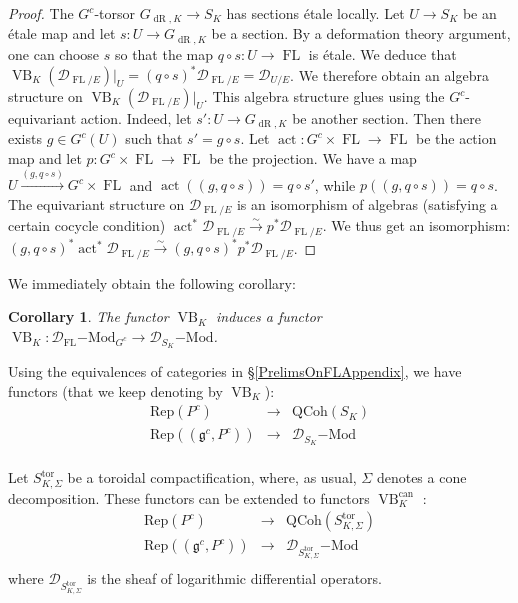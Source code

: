 \documentclass[10pt, oneside]{amsart}
\numberwithin{equation}{subsection}
\newtheorem{corollary}[equation]{Corollary}
\theoremstyle{definition}
\theoremstyle{remark}
\newcommand{\opn}[1]{\operatorname{#1}}
\begin{document}
\begin{proof}
The $G^c$-torsor $G_{\opn{dR},K} \rightarrow S_K$ has sections \'etale locally. Let $U \rightarrow S_K$ be an \'etale map and let $s : U \rightarrow G_{\opn{dR}, K}$ be a section. By a deformation theory argument, one can choose $s$ so that the map $q \circ s : U \rightarrow \opn{FL}$ is \'etale. We deduce that $\opn{VB}_K(\mathcal{D}_{\opn{FL}/E})\vert_U 
 = (q\circ s)^* \mathcal{D}_{\opn{FL}/E} = \mathcal{D}_{U/E}$. 
 We therefore obtain an algebra structure on $\opn{VB}_K(\mathcal{D}_{\opn{FL}/E})\vert_U $. This algebra structure glues using the $G^c$-equivariant action.  Indeed, let $s' : U \rightarrow G_{\opn{dR}, K}$ be another section. Then there exists $g \in G^c(U)$ such that $s' = g \circ s$. Let $\opn{act} : G^c \times \opn{FL} \rightarrow \opn{FL}$ be the action map and let $p : G^c \times \opn{FL} \rightarrow \opn{FL}$ be the projection. We have a map $U \stackrel{(g, q \circ s)}\rightarrow G^c \times \opn{FL}$ and $\opn{act} ( (g, q \circ s)) = q \circ s'$, while $p ( (g, q\circ s)) = q \circ s$. The equivariant structure on 
$\mathcal{D}_{\opn{FL}/E}$ is an isomorphism of algebras (satisfying a certain cocycle condition) $\opn{act}^* \mathcal{D}_{\opn{FL}/E} \xrightarrow{\sim} p^* \mathcal{D}_{\opn{FL}/E}$. We thus get an isomorphism: $ (g, q\circ s)^* \opn{act}^* \mathcal{D}_{\opn{FL}/E} \xrightarrow{\sim}  (g, q \circ s)^* p^* \mathcal{D}_{\opn{FL}/E}$. 
\end{proof}

We immediately obtain the following corollary:

\begin{corollary} 
The functor $\opn{VB}_K$ induces a functor $\opn{VB}_K \colon \mathcal{D}_{\opn{FL}}\mathrm{-Mod}_{G^c} \rightarrow  \mathcal{D}_{S_K}\mathrm{-Mod}$. 
\end{corollary}

Using the equivalences of categories in \S \ref{PrelimsOnFLAppendix}, we have functors (that we keep denoting by $\opn{VB}_K$):
\begin{eqnarray*}
\mathrm{Rep}(P^c) & \rightarrow & \mathrm{QCoh}(S_K) \\
\mathrm{Rep}((\mathfrak{g}^c, P^c)) & \rightarrow & \mathcal{D}_{S_K}\mathrm{-Mod} \\
\end{eqnarray*}

Let $S_{K,\Sigma}^{\opn{tor}}$ be a toroidal compactification, where, as usual, $\Sigma$ denotes a cone decomposition. These functors can be extended to functors $\opn{VB}^{\opn{can}}_K$ : 
\begin{eqnarray*}
\mathrm{Rep}(P^c) & \rightarrow & \mathrm{QCoh}(S^{\opn{tor}}_{K,\Sigma}) \\
\mathrm{Rep}((\mathfrak{g}^c, P^c)) & \rightarrow & \mathcal{D}_{S^{\opn{tor}}_{K,\Sigma}}\mathrm{-Mod} \\
\end{eqnarray*}
where $\mathcal{D}_{S^{\opn{tor}}_{K,\Sigma}}$ is the sheaf of logarithmic differential operators.  
\end{document}
